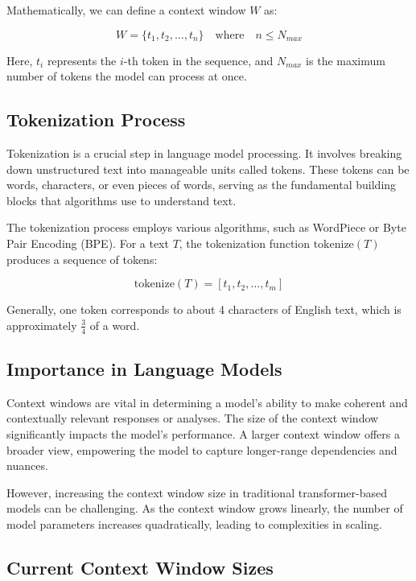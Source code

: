 \documentclass{article}
\begin{document}
Mathematically, we can define a context window $W$ as:

\begin{equation}
W = \{t_1, t_2, \ldots, t_n\} \quad \textrm{where} \quad n \leq N_{max}
\end{equation}

Here, $t_i$ represents the $i$-th token in the sequence, and $N_{max}$ is the maximum number of tokens the model can process at once.

\subsection{Tokenization Process}

Tokenization is a crucial step in language model processing. It involves breaking down unstructured text into manageable units called tokens. These tokens can be words, characters, or even pieces of words, serving as the fundamental building blocks that algorithms use to understand text.

The tokenization process employs various algorithms, such as WordPiece or Byte Pair Encoding (BPE). For a text $T$, the tokenization function $\textrm{tokenize}(T)$ produces a sequence of tokens:

\begin{equation}
\textrm{tokenize}(T) = [t_1, t_2, \ldots, t_m]
\end{equation}

Generally, one token corresponds to about 4 characters of English text, which is approximately $\frac{3}{4}$ of a word.

\subsection{Importance in Language Models}

Context windows are vital in determining a model's ability to make coherent and contextually relevant responses or analyses. The size of the context window significantly impacts the model's performance. A larger context window offers a broader view, empowering the model to capture longer-range dependencies and nuances.

However, increasing the context window size in traditional transformer-based models can be challenging. As the context window grows linearly, the number of model parameters increases quadratically, leading to complexities in scaling.

\subsection{Current Context Window Sizes}
\end{document}
